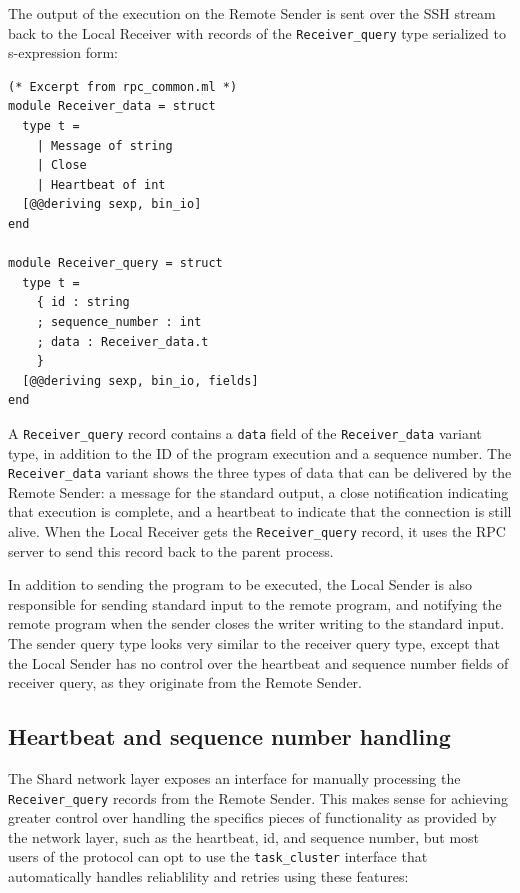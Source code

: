 \documentclass[twoside]{report}
\begin{document}
The output of the execution on the Remote Sender is sent over the SSH stream back to the Local Receiver with records of the \texttt{Receiver\_query} type serialized to s-expression form:

\begin{minipage}[c]{\textwidth-15pt}
  \begin{lstlisting}
(* Excerpt from rpc_common.ml *)
module Receiver_data = struct
  type t =
    | Message of string
    | Close
    | Heartbeat of int
  [@@deriving sexp, bin_io]
end

module Receiver_query = struct
  type t =
    { id : string
    ; sequence_number : int
    ; data : Receiver_data.t
    }
  [@@deriving sexp, bin_io, fields]
end
\end{lstlisting}
  \smallskip
\end{minipage}

A \texttt{Receiver\_query} record contains a \texttt{data} field of the \texttt{Receiver\_data} variant type, in addition to the ID of the program execution and a sequence number.
The \texttt{Receiver\_data} variant shows the three types of data that can be delivered by the Remote Sender: a message for the standard output, a close notification indicating that execution is complete, and a heartbeat to indicate that the connection is still alive.
When the Local Receiver gets the \texttt{Receiver\_query} record, it uses the RPC server to send this record back to the parent process.

In addition to sending the program to be executed, the Local Sender is also responsible for sending standard input to the remote program, and notifying the remote program when the sender closes the writer writing to the standard input.
The sender query type looks very similar to the receiver query type, except that the Local Sender has no control over the heartbeat and sequence number fields of receiver query, as they originate from the Remote Sender.

\subsection{Heartbeat and sequence number handling}
The Shard network layer exposes an interface for manually processing the \texttt{Receiver\_query} records from the Remote Sender.
This makes sense for achieving greater control over handling the specifics pieces of functionality as provided by the network layer, such as the heartbeat, id, and sequence number, but most users of the protocol can opt to use the \texttt{task\_cluster} interface that automatically handles reliablility and retries using these features:
\end{document}
